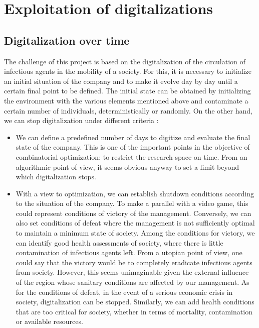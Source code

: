 \chapter{Exploitation of digitalizations}

\section{Digitalization over time}

The challenge of this project is based on the digitalization of the circulation of infectious agents in the mobility of a society. For this, it is necessary to initialize an initial situation of the company and to make it evolve day by day until a certain final point to be defined. The initial state can be obtained by initializing the environment with the various elements mentioned above and contaminate a certain number of individuals, deterministically or randomly. On the other hand, we can stop digitalization under different criteria :\\

\begin{itemize}

\item We can define a predefined number of days to digitize and evaluate the final state of the company. This is one of the important points in the objective of combinatorial optimization: to restrict the research space on time. From an algorithmic point of view, it seems obvious anyway to set a limit beyond which digitalization stops.

\item With a view to optimization, we can establish shutdown conditions according to the situation of the company. To make a parallel with a video game, this could represent conditions of victory of the management. Conversely, we can also set conditions of defeat where the management is not sufficiently optimal to maintain a minimum state of society. Among the conditions for victory, we can identify good health assessments of society, where there is little contamination of infectious agents left. From a utopian point of view, one could say that the victory would be to completely eradicate infectious agents from society. However, this seems unimaginable given the external influence of the region whose sanitary conditions are affected by our management. As for the conditions of defeat, in the event of a serious economic crisis in society, digitalization can be stopped. Similarly, we can add health conditions that are too critical for society, whether in terms of mortality, contamination or available resources.\\

\end{itemize}

